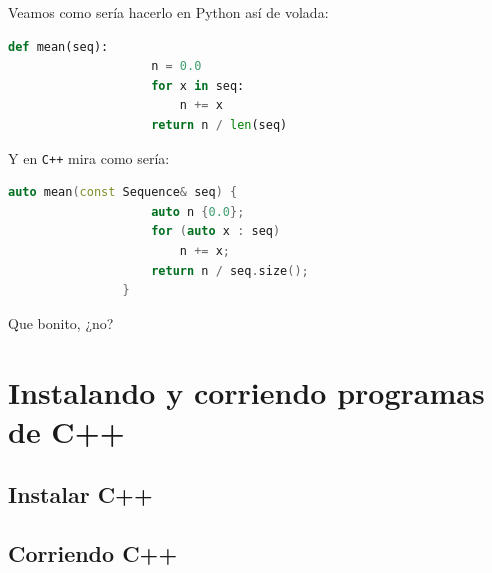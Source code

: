 \documentclass[12pt, fleqn]{report}                             %
\theoremstyle{break}                                            %
\newcommand{\textCode}[1]  { \texttt{#1} }                      %
\newcommand{\Cpp}{\ignorespaces\textCode{C++}}                  %
\begin{document}
            Veamos como sería hacerlo en Python así de volada:
            \begin{lstlisting}[language=python, gobble=16]
                def mean(seq):
                    n = 0.0
                    for x in seq:
                        n += x
                    return n / len(seq)
            \end{lstlisting}

            Y en \Cpp mira como sería:
            \begin{lstlisting}[language=C++, gobble=16]
                auto mean(const Sequence& seq) {
                    auto n {0.0};
                    for (auto x : seq)
                        n += x;
                    return n / seq.size();
                }
            \end{lstlisting}

            Que bonito, ¿no?
            \cite{ModernCppWhatYouNeedToKnow}

    \clearpage
    \chapter{Instalando y corriendo programas de C++}

        \clearpage
        \section{Instalar C++}

        \clearpage
        \section{Corriendo C++}

        \clearpage
\end{document}
